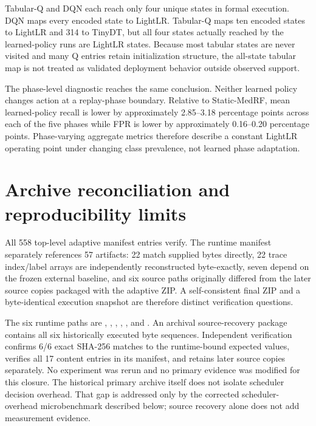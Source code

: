 \documentclass[10pt,a4paper]{article}
\begin{document}
Tabular-Q and DQN each reach only four unique states in formal execution. DQN maps every encoded state to LightLR. Tabular-Q maps ten encoded states to LightLR and 314 to TinyDT, but all four states actually reached by the learned-policy runs are LightLR states. Because most tabular states are never visited and many Q entries retain initialization structure, the all-state tabular map is not treated as validated deployment behavior outside observed support.

The phase-level diagnostic reaches the same conclusion. Neither learned policy changes action at a replay-phase boundary. Relative to Static-MedRF, mean learned-policy recall is lower by approximately 2.85--3.18 percentage points across each of the five phases while FPR is lower by approximately 0.16--0.20 percentage points. Phase-varying aggregate metrics therefore describe a constant LightLR operating point under changing class prevalence, not learned phase adaptation.

\section{Archive reconciliation and reproducibility limits}
All 558 top-level adaptive manifest entries verify. The runtime manifest separately references 57 artifacts: 22 match supplied bytes directly, 22 trace index/label arrays are independently reconstructed byte-exactly, seven depend on the frozen external baseline, and six source paths originally differed from the later source copies packaged with the adaptive ZIP. A self-consistent final ZIP and a byte-identical execution snapshot are therefore distinct verification questions.

The six runtime paths are , , , , , and . An archival source-recovery package contains all six historically executed byte sequences. Independent verification confirms 6/6 exact SHA-256 matches to the runtime-bound expected values, verifies all 17 content entries in its manifest, and retains later source copies separately. No experiment was rerun and no primary evidence was modified for this closure. The historical primary archive itself does not isolate scheduler decision overhead. That gap is addressed only by the corrected scheduler-overhead microbenchmark described below; source recovery alone does not add measurement evidence.

\clearpage
\end{document}
